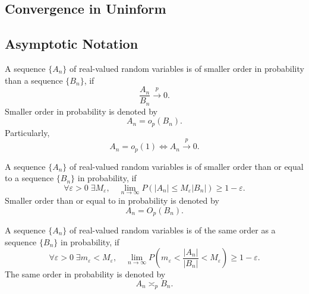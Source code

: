\begin{remark}

\end{remark}

\subsection{Convergence in Uninform}

\begin{definition}

\end{definition}

\subsection{Asymptotic Notation}

\begin{definition}
	A sequence $\{A_n\}$ of real-valued random variables is of smaller order in probability than a sequence $\{B_n\}$, if
	\begin{equation}
		\frac{A_n}{B_n}\stackrel{p}{\rightarrow}0.
	\end{equation}
	Smaller order in probability is denoted by
	\begin{equation}
		A_n=o_p(B_n).
	\end{equation}
	Particularly,
	\begin{equation}
		A_n=o_p(1)\iff A_n\stackrel{p}{\rightarrow}0.
	\end{equation}
\end{definition}

\begin{definition}
	A sequence $\{A_n\}$ of real-valued random variables is of smaller order than or equal to a sequence $\{B_n\}$ in probability, if
	\begin{equation}
		\forall\varepsilon>0\;\exists M_\varepsilon,\quad\lim_{n\rightarrow\infty} P\left(|A_n|\leq M_\varepsilon|B_n|\right)\geq 1-\varepsilon.
	\end{equation}
	Smaller order than or equal to in probability is denoted by
	\begin{equation}
		A_n=O_p(B_n).
	\end{equation}
\end{definition}

\begin{definition}
	A sequence $\{A_n\}$ of real-valued random variables is of the same order as a sequence $\{B_n\}$ in probability, if
	\begin{equation}
		\forall\varepsilon>0\;\exists m_{\varepsilon}<M_{\varepsilon},\quad\lim_{n\rightarrow\infty} P\left(m_{\varepsilon}<\frac{|A_{n}|}{|B_{n}|}<M_{\varepsilon}\right)\geq 1-\varepsilon.
	\end{equation}
	The same order in probability is denoted by
	\begin{equation}
		A_{n}\asymp_{p}B_{n}.
	\end{equation}
\end{definition}

